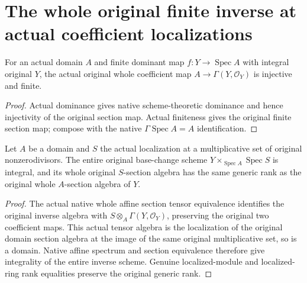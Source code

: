 \section{The whole original finite inverse at actual coefficient localizations}

\begin{theorem}
\label{thm:fc-localized-finite-original-coefficients}
\leanok
{}
For an actual domain $A$ and finite dominant map
$f:Y\to\operatorname{Spec}A$ with integral original $Y$, the actual original whole coefficient map
$A\to\Gamma(Y,\mathcal O_Y)$ is injective and finite.
\end{theorem}
\begin{proof}
Actual dominance gives native scheme-theoretic dominance and hence
injectivity of the original section map.  Actual finiteness gives the
original finite section map; compose with the native
$\Gamma\operatorname{Spec}A=A$ identification.
\end{proof}

\begin{theorem}
\label{thm:fc-localized-finite-whole-integrality-rank}
\leanok
{}
Let $A$ be a domain and $S$ the actual localization at a multiplicative
set of original nonzerodivisors.  The entire original base-change scheme
$Y\times_{\operatorname{Spec}A}\operatorname{Spec}S$ is integral, and its
whole original $S$-section algebra has the same generic rank as the
original whole $A$-section algebra of $Y$.
\end{theorem}
\begin{proof}
The actual native whole affine section tensor equivalence identifies the
original inverse algebra with $S\otimes_A\Gamma(Y,\mathcal O_Y)$, preserving
the original two coefficient maps.  This actual tensor algebra is the
localization of the original domain section algebra at the image of the
same original multiplicative set, so is a domain.  Native affine spectrum
and section equivalence therefore give integrality of the entire inverse
scheme.  Genuine localized-module and localized-ring rank equalities
preserve the original generic rank.
\end{proof}

